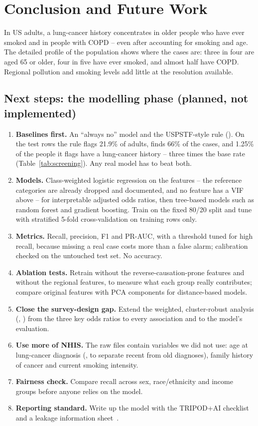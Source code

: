 \section{Conclusion and Future Work}\label{sec:conclusion}

In US adults, a lung-cancer history concentrates in older people who have ever smoked and in people with COPD -- even after accounting for smoking and age. The detailed profile of the population shows where the \nCases cases are: three in four are aged 65 or older, four in five have ever smoked, and almost half have COPD. Regional pollution and smoking levels add little at the resolution available.

\subsection{Next steps: the modelling phase (planned, not implemented)}\label{sec:next}

\begin{enumerate}
  \item \textbf{Baselines first.} An ``always no'' model and the USPSTF-style rule (). On the test rows the rule flags 21.9\% of adults, finds 66\% of the cases, and 1.25\% of the people it flags have a lung-cancer history -- three times the base rate (Table~\ref{tab:screening}). Any real model has to beat both.
  \item \textbf{Models.} Class-weighted logistic regression on the \nFeatures features -- the reference categories are already dropped and documented, and no feature has a VIF above \maxVIFshort{} -- for interpretable adjusted odds ratios, then tree-based models such as random forest and gradient boosting. Train on the fixed 80/20 split and tune with stratified 5-fold cross-validation on training rows only.
  \item \textbf{Metrics.} Recall, precision, F1 and PR-AUC, with a threshold tuned for high recall, because missing a real case costs more than a false alarm; calibration checked on the untouched test set. No accuracy.
  \item \textbf{Ablation tests.} Retrain without the reverse-causation-prone features and without the regional features, to measure what each group really contributes; compare original features with PCA components for distance-based models.
  \item \textbf{Close the survey-design gap.} Extend the weighted, cluster-robust analysis (, ) from the three key odds ratios to every association and to the model's evaluation.
  \item \textbf{Use more of NHIS.} The raw files contain variables we did not use: age at lung-cancer diagnosis (, to separate recent from old diagnoses), family history of cancer and current smoking intensity.
  \item \textbf{Fairness check.} Compare recall across sex, race/ethnicity and income groups before anyone relies on the model.
  \item \textbf{Reporting standard.} Write up the model with the TRIPOD+AI checklist~\cite{tripod} and a leakage information sheet~\cite{kapoor}.
\end{enumerate}

